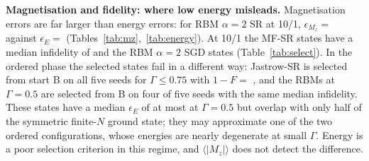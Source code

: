 \textbf{Magnetisation and fidelity: where low energy misleads.} Magnetisation errors are far larger than energy errors: for RBM $\alpha{=}2$ SR at 10/1, $\epsilon_{M_z}=$  against $\epsilon_E=$  (Tables~\ref{tab:mz},~\ref{tab:energy}). At 10/1 the MF-SR states have a median infidelity of  and the RBM $\alpha{=}2$ SGD states  (Table~\ref{tab:select}). In the ordered phase the selected states fail in a different way: Jastrow-SR is selected from start B on all five seeds for $\Gamma\le0.75$ with $1-F=$ , and the RBMs at $\Gamma{=}0.5$ are selected from B on four of five seeds with the same median infidelity. These states have a median $\epsilon_E$ of at most  at $\Gamma{=}0.5$ but overlap with only half of the symmetric finite-$N$ ground state; they may approximate one of the two ordered configurations, whose energies are nearly degenerate at small $\Gamma$. Energy is a poor selection criterion in this regime, and $\langle|M_z|\rangle$ does not detect the difference.
